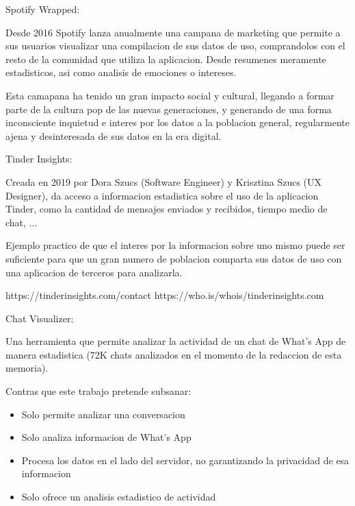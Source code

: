 
Spotify Wrapped:

Desde 2016 Spotify lanza anualmente una campana de marketing que permite a sus usuarios visualizar una compilacion de sus datos de uso, comprandolos con el resto de la comunidad que utiliza la aplicacion. Desde resumenes meramente estadisticos, asi como analisis de emociones o intereses.

Esta camapana ha tenido un gran impacto social y cultural, llegando a formar parte de la cultura pop de las nuevas generaciones, y generando de una forma inconsciente inquietud e interes por los datos a la poblacion general, regularmente ajena y desinteresada de sus datos en la era digital.

Tinder Insights:

Creada en 2019 por Dora Szucs (Software Engineer) y Krisztina Szucs (UX Designer), da acceso a informacion estadistica sobre el uso de la aplicacion Tinder, como la cantidad de mensajes enviados y recibidos, tiempo medio de chat, ...

Ejemplo practico de que el interes por la informacion sobre uno mismo puede ser suficiente para que un gran numero de poblacion comparta sus datos de uso con una aplicacion de terceros para analizarla.

https://tinderinsights.com/contact
https://who.is/whois/tinderinsights.com

Chat Visualizer:

Una herramienta que permite analizar la actividad de un chat de What's App de manera estadistica (72K chats analizados en el momento de la redaccion de esta memoria).

Contras que este trabajo pretende subsanar:
\begin{itemize}
    \item Solo permite analizar una conversacion
    \item Solo analiza informacion de What's App
    \item Procesa los datos en el lado del servidor, no garantizando la privacidad de esa informacion
    \item Solo ofrece un analisis estadistico de actividad
\end{itemize}
